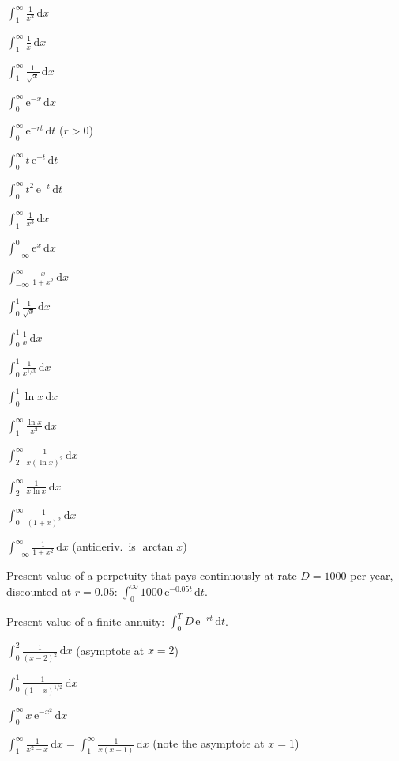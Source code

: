 \begin{problems}
  \item $\displaystyle\int_{1}^{\infty} \frac{1}{x^{2}}\,\mathrm{d}x$
  \item $\displaystyle\int_{1}^{\infty} \frac{1}{x}\,\mathrm{d}x$
  \item $\displaystyle\int_{1}^{\infty} \frac{1}{\sqrt{x}}\,\mathrm{d}x$
  \item $\displaystyle\int_{0}^{\infty} \mathrm{e}^{-x}\,\mathrm{d}x$
  \item $\displaystyle\int_{0}^{\infty} \mathrm{e}^{-rt}\,\mathrm{d}t$
        \quad ($r>0$)
  \item $\displaystyle\int_{0}^{\infty} t\,\mathrm{e}^{-t}\,\mathrm{d}t$
  \item $\displaystyle\int_{0}^{\infty} t^{2}\,\mathrm{e}^{-t}\,\mathrm{d}t$
  \item $\displaystyle\int_{1}^{\infty} \frac{1}{x^{3}}\,\mathrm{d}x$
  \item $\displaystyle\int_{-\infty}^{0} \mathrm{e}^{x}\,\mathrm{d}x$
  \item $\displaystyle\int_{-\infty}^{\infty} \frac{x}{1+x^{2}}\,\mathrm{d}x$
  \item $\displaystyle\int_{0}^{1} \frac{1}{\sqrt{x}}\,\mathrm{d}x$
  \item $\displaystyle\int_{0}^{1} \frac{1}{x}\,\mathrm{d}x$
  \item $\displaystyle\int_{0}^{1} \frac{1}{x^{1/3}}\,\mathrm{d}x$
  \item $\displaystyle\int_{0}^{1} \ln x\,\mathrm{d}x$
  \item $\displaystyle\int_{1}^{\infty} \frac{\ln x}{x^{2}}\,\mathrm{d}x$
  \item $\displaystyle\int_{2}^{\infty} \frac{1}{x(\ln x)^{2}}\,\mathrm{d}x$
  \item $\displaystyle\int_{2}^{\infty} \frac{1}{x\ln x}\,\mathrm{d}x$
  \item $\displaystyle\int_{0}^{\infty} \frac{1}{(1+x)^{2}}\,\mathrm{d}x$
  \item $\displaystyle\int_{-\infty}^{\infty} \frac{1}{1+x^{2}}\,\mathrm{d}x$
        \quad (antideriv.\ is $\arctan x$)
  \item Present value of a perpetuity that pays continuously at rate
        $D=1000$ per year, discounted at $r=0.05$:
        $\displaystyle\int_{0}^{\infty} 1000\,\mathrm{e}^{-0.05t}\,\mathrm{d}t$.
  \item Present value of a finite annuity:
        $\displaystyle\int_{0}^{T} D\,\mathrm{e}^{-rt}\,\mathrm{d}t$.
  \item $\displaystyle\int_{0}^{2} \frac{1}{(x-2)^{2}}\,\mathrm{d}x$
        \quad (asymptote at $x=2$)
  \item $\displaystyle\int_{0}^{1} \frac{1}{(1-x)^{1/2}}\,\mathrm{d}x$
  \item $\displaystyle\int_{0}^{\infty} x\,\mathrm{e}^{-x^{2}}\,\mathrm{d}x$
  \item $\displaystyle\int_{1}^{\infty} \frac{1}{x^{2}-x}\,\mathrm{d}x
        = \int_{1}^{\infty} \frac{1}{x(x-1)}\,\mathrm{d}x$
        \quad (note the asymptote at $x=1$)
\end{problems}

